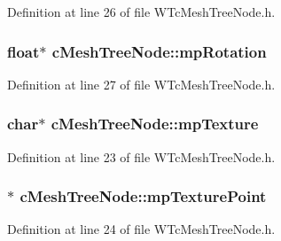 Definition at line 26 of file WTcMeshTreeNode.h.

\hypertarget{classc_mesh_tree_node_a24e4bf28242619afb11daf82bd930a6d}{
\subsubsection[{mpRotation}]{\setlength{\rightskip}{0pt plus 5cm}float$\ast$ {\bf cMeshTreeNode::mpRotation}}}
\label{classc_mesh_tree_node_a24e4bf28242619afb11daf82bd930a6d}


Definition at line 27 of file WTcMeshTreeNode.h.

\hypertarget{classc_mesh_tree_node_ade5fa05534442fd9a55a50741ddfd32e}{
\subsubsection[{mpTexture}]{\setlength{\rightskip}{0pt plus 5cm}char$\ast$ {\bf cMeshTreeNode::mpTexture}}}
\label{classc_mesh_tree_node_ade5fa05534442fd9a55a50741ddfd32e}


Definition at line 23 of file WTcMeshTreeNode.h.

\hypertarget{classc_mesh_tree_node_a2c26ffbd7a3eade15a8e1943dc5eff40}{
\subsubsection[{mpTexturePoint}]{$\ast$ {\bf cMeshTreeNode::mpTexturePoint}}}
\label{classc_mesh_tree_node_a2c26ffbd7a3eade15a8e1943dc5eff40}


Definition at line 24 of file WTcMeshTreeNode.h.

